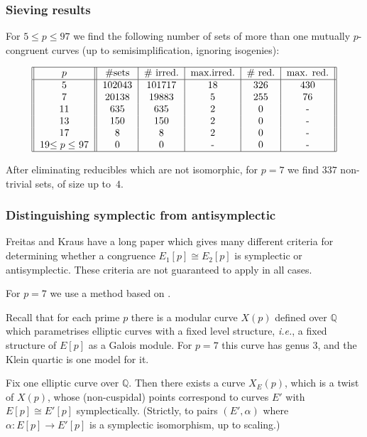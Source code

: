 \documentclass[compress]{beamer}
\newcommand{\Q}{\mathbb Q}
\newcommand{\high}[1]{\emph{\color{blue}{#1}}}
\begin{document}
\begin{frame}\frametitle{Sieving results}
  For $5\le p\le 97$ we find the following number of sets of more than
  one mutually $p$-congruent curves (up to semisimplification,
  ignoring isogenies):

  \[
  \begin{tabular}{||c||c|c|c|c|c||}
    \hline
    $p$ & \#sets & \# irred. & max.irred. & \# red. & max. red.\\
    \hline
    5 & 102043 & 101717 & 18 & 326 & 430 \\
    7 & 20138 & 19883 & 5 & 255 & 76 \\
    11 & 635 & 635 & 2 & 0 & - \\
    13 & 150 & 150 & 2 & 0 & - \\
    17 & 8 & 8 & 2 & 0 & - \\
    19$\le p\le$ 97 & 0 & 0 & - & 0 & - \\
    \hline
  \end{tabular}
  \]

After eliminating reducibles which are not isomorphic, for $p=7$ we
find $337$ non-trivial sets, of size up to~$4$.
\end{frame}

\begin{frame}\frametitle{Distinguishing symplectic from
    antisymplectic} Freitas and Kraus have a long paper which gives
  many different \high{local} criteria for determining whether a
  congruence $E_1[p]\cong E_2[p]$ is symplectic or antisymplectic.
  These criteria are not guaranteed to apply in all cases.

\pause\medskip

  For $p=7$ we use a method based on \high{modular curves}.

  Recall that for each prime $p$ there is a modular curve $X(p)$
  defined over $\Q$ which parametrises elliptic curves with a fixed
  level structure, \textit{i.e.}, a fixed structure of $E[p]$ as a
  Galois module.  For $p=7$ this curve has genus $3$, and the Klein
  quartic is one model for it.

    \pause
  \medskip
  Fix one elliptic curve over $\Q$.  Then there exists a curve
  $X_E(p)$, which is a twist of $X(p)$, whose (non-cuspidal) points
  correspond to curves $E'$ with $E[p]\cong E'[p]$ symplectically.
  (Strictly, to pairs $(E',\alpha)$ where $\alpha:E[p]\to E'[p]$ is a
  symplectic isomorphism, up to scaling.)
\end{frame}
\end{document}
